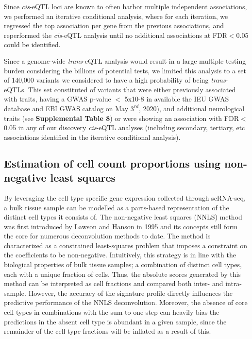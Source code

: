 {Since \emph{cis}-eQTL loci are known to often harbor multiple independent associations, we performed an iterative conditional analysis, where for each iteration, we regressed the top association per gene from the previous associations, and reperformed the \emph{cis}-eQTL analysis until no additional associations at FDR$<$0.05 could be identified. 

Since a genome-wide \emph{trans}-eQTL analysis would result in a large multiple testing burden considering the billions of potential tests, we limited this analysis to a set of 140,000 variants we considered to have a high probability of being \emph{trans}-eQTLs. This set constituted of variants that were either previously associated with traits, having a GWAS p-value $<$ 5x10-8 in available the IEU GWAS database\cite{lyonVariantCallFormat2020} and EBI GWAS catalog\cite{bunielloNHGRIEBIGWASCatalog2019} on May $3^{rd}$, 2020), and additional neurological traits (see \textbf{Supplemental Table 8}) or were showing an association with FDR$<$0.05 in any of our discovery \emph{cis}-eQTL analyses (including secondary, tertiary, etc associations identified in the iterative conditional analysis). 

\subsection{Estimation of cell count proportions using non-negative least squares}
By leveraging the cell type specific gene expression collected through scRNA-seq, a bulk tissue sample can be modelled as a parts-based representation of the distinct cell types it consists of. The non-negative least squares (NNLS) method was first introduced by Lawson and Hanson in 1995\cite{lawsonSolvingLeastSquares1995} and its concepts still form the core for numerous deconvolution methods to date. The method is characterized as a constrained least-squares problem that imposes a constraint on the coefficients to be non-negative. Intuitively, this strategy is in line with the biological properties of bulk tissue samples; a combination of distinct cell types, each with a unique fraction of cells. Thus, the absolute scores generated by this method can be interpreted as cell fractions and compared both inter- and intra-sample\cite{sturmComprehensiveEvaluationComputational2018}. However, the accuracy of the signature profile directly influences the predictive performance of the NNLS deconvolution. Moreover, the absence of core cell types in combinations with the sum-to-one step can heavily bias the predictions in the absent cell type is abundant in a given sample, since the remainder of the cell type fractions will be inflated as a result of this. 

}
